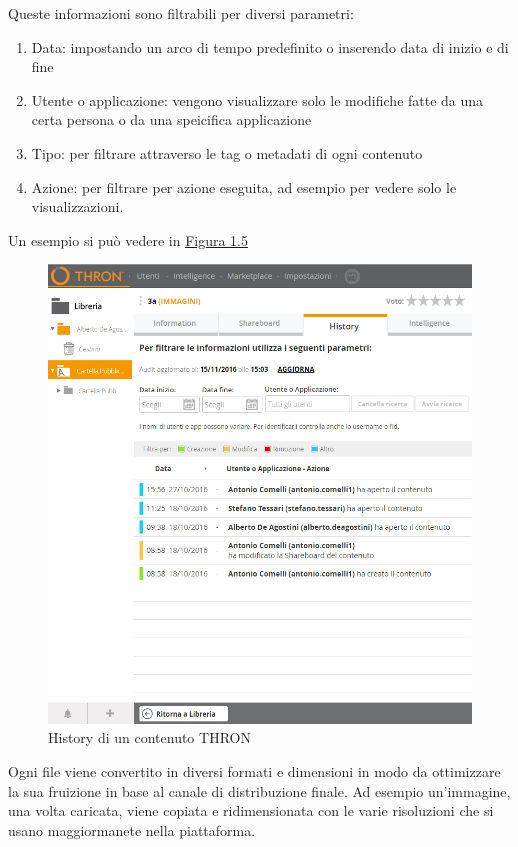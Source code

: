 \documentclass[a4paper, 12pt, twoside, openright]{book}
\begin{document}
Queste informazioni sono filtrabili per diversi parametri:
\begin{enumerate}
\item Data: impostando un arco di tempo predefinito o inserendo data di inizio e di fine
\item Utente o applicazione: vengono visualizzare solo le modifiche fatte da una certa persona o da una speicifica applicazione
\item Tipo: per filtrare attraverso le tag o metadati di ogni contenuto
\item Azione: per filtrare per azione eseguita, ad esempio per vedere solo le visualizzazioni.
\end{enumerate}
Un esempio si può vedere in \hyperref[content-history]{Figura 1.5}
\begin{figure}[h] %
	\centering
	\label{content-history}
	\includegraphics[width=1.0\textwidth]{images/content-history.jpg}
	\caption{History di un contenuto THRON}
\end{figure}
Ogni file viene convertito in diversi formati e dimensioni in modo da ottimizzare la sua fruizione in base al canale di distribuzione finale. Ad esempio un'immagine, una volta caricata, viene copiata e ridimensionata con le varie risoluzioni che si usano maggiormanete nella piattaforma.\\
\end{document}
